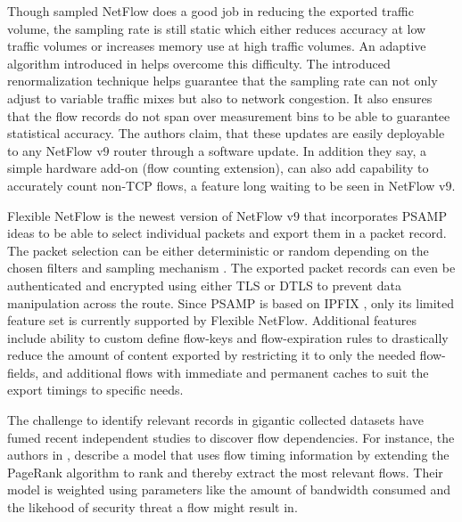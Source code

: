Though sampled NetFlow does a good job in reducing the exported traffic volume, the sampling rate is still static which either reduces accuracy at low traffic volumes or increases memory use at high traffic volumes. An adaptive algorithm introduced in \cite{cestan:2004} helps overcome this difficulty. The introduced renormalization technique helps guarantee that the sampling rate can not only adjust to variable traffic mixes but also to network congestion. It also ensures that the flow records do not span over measurement bins to be able to guarantee statistical accuracy. The authors claim, that  these updates are easily deployable to any NetFlow v$9$ router through a software update. In addition they say, a simple hardware add-on (flow counting extension), can also add capability to accurately count non-\ac{TCP} flows, a feature long waiting to be seen in NetFlow v$9$.

Flexible NetFlow is the newest version of NetFlow v$9$ that incorporates \ac{PSAMP} \cite{rfc5474} ideas to be able to select individual packets and export them in a packet record. The packet selection can be either deterministic or random depending on the chosen filters and sampling mechanism \cite{rfc5475}. The exported packet records can even be authenticated and encrypted using either \ac{TLS} \cite{rfc5246} or \ac{DTLS} \cite{rfc4347}  to prevent data manipulation across the route. Since \ac{PSAMP} is based on \ac{IPFIX} \cite{rfc5476}, only its limited feature set is currently supported by Flexible NetFlow. Additional features include ability to custom define flow-keys and flow-expiration rules to drastically reduce the amount of content exported by restricting it to only the needed flow-fields, and additional flows with immediate and permanent caches to suit the export timings to specific needs.

The challenge to identify relevant records in gigantic collected datasets have fumed recent independent studies to discover flow dependencies. For instance, the authors in \cite{swang:2010}, describe a model that uses flow timing information by extending  the PageRank \cite{lpage:1999} algorithm to rank and thereby extract the most relevant flows. Their model is weighted using parameters like the amount of bandwidth consumed and the likehood of security threat a flow might result in.

